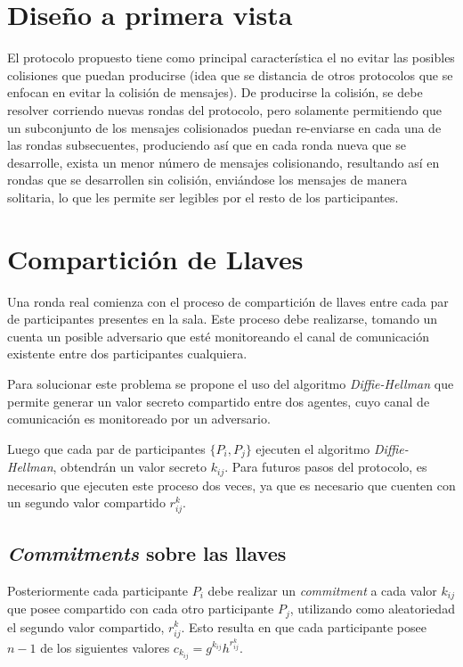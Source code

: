 \section{Diseño a primera vista}

El protocolo propuesto tiene como principal característica el no evitar las 
posibles colisiones que puedan producirse (idea que se distancia de otros protocolos 
que se enfocan en evitar la colisión de mensajes). De producirse la colisión, se 
debe resolver corriendo nuevas rondas del protocolo, pero solamente permitiendo 
que un subconjunto de los mensajes colisionados puedan re-enviarse en cada una 
de las rondas subsecuentes, produciendo así que en cada ronda nueva que se 
desarrolle, exista un menor número de mensajes colisionando, resultando así 
en rondas que se desarrollen sin colisión, enviándose los mensajes de manera 
solitaria, lo que les permite ser legibles por el resto de los participantes.


\section{Compartición de Llaves}

Una ronda real comienza con el proceso de compartición de llaves entre cada 
par de participantes presentes en la sala. Este proceso debe realizarse, 
tomando un cuenta un posible adversario que esté monitoreando el canal de 
comunicación existente entre dos participantes cualquiera.

Para solucionar este problema se propone el uso del algoritmo 
\emph{Diffie-Hellman} \cite{diffie1976new} que permite generar un valor 
secreto compartido entre dos agentes, cuyo canal de comunicación es 
monitoreado por un adversario.

Luego que cada par de participantes $\{P_i, P_j\}$ ejecuten el algoritmo 
\emph{Diffie-Hellman}, obtendrán un valor secreto $k_{ij}$. Para futuros pasos 
del protocolo, es necesario que ejecuten este proceso dos veces, ya que es 
necesario que cuenten con un segundo valor compartido $r^k_{ij}$.

\subsection{\emph{Commitments} sobre las llaves}

Posteriormente cada participante $P_i$ debe realizar un \emph{commitment} a 
cada valor $k_{ij}$ que posee compartido con cada otro participante $P_j$, 
utilizando como aleatoriedad el segundo valor compartido, $r^k_{ij}$. Esto 
resulta en que cada participante posee $n - 1$ de los siguientes valores 
$c_{k_{ij}} = g^{k_{ij}} h^{r^k_{ij}}$.

